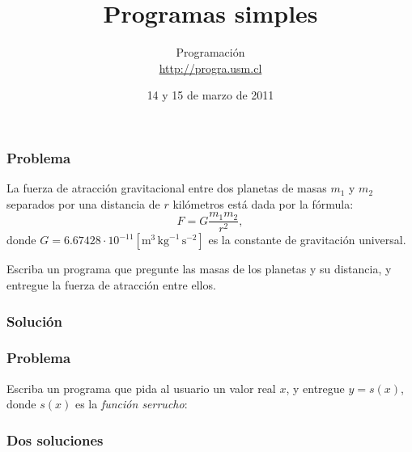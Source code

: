 \documentclass[12pt]{beamer}
\title{Programas simples}
\author{Programación \\ \url{http://progra.usm.cl}}
\date{14 y 15 de marzo de 2011}
\begin{document}
  \begin{frame}
    \maketitle
  \end{frame}

  \begin{frame}
    \label{problema-gravitacion}
    \frametitle{Problema}
    La fuerza de atracción gravitacional
    entre dos planetas de masas \(m_1\) y \(m_2\)
    separados por una distancia de \(r\) kilómetros
    está dada por la fórmula:
    \[ F = G\frac{m_1 m_2}{r^2}, \]
    donde
    \(G = 6.67428\cdot 10^{-11} [\text{m}^3\,\text{kg}^{-1}\,\text{s}^{-2}]\)
    es la constante de gravitación universal.

    Escriba un programa que pregunte las masas de los planetas y su distancia,
    y entregue la fuerza de atracción entre ellos.
  \end{frame}

  \begin{frame}
    \label{gravitacion}
    \frametitle{Solución}
    
  \end{frame}

  \begin{frame}
    \label{problema-serrucho}
    \frametitle{Problema}
    Escriba un programa que pida al usuario un valor real \(x\),
    y entregue \(y = s(x)\),
    donde \(s(x)\) es la \emph{función serrucho}:

    \begin{center}
    \end{center}

    
  \end{frame}

  \begin{frame}
    \label{serrucho}
    \frametitle{Dos soluciones}
    
  \end{frame}
\end{document}
